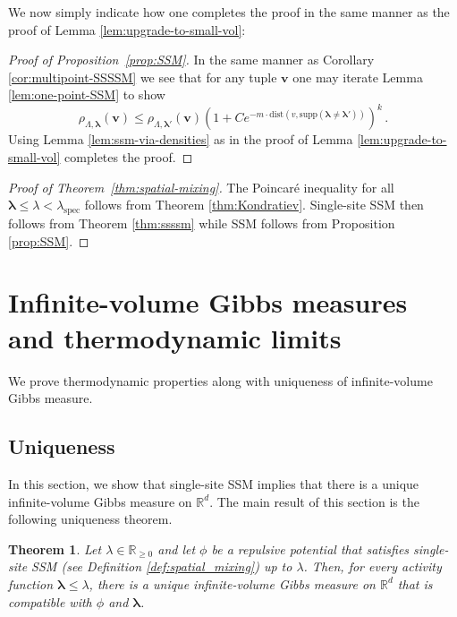 \documentclass[10pt]{amsart}
\newtheorem{theorem}{Theorem}[section]
\theoremstyle{definition}
\theoremstyle{remark}
\newcommand{\spec}{{\mathrm{spec}}}
\newcommand{\blambda}{{\boldsymbol{\lambda}}}
\newcommand{\dist}{\mathrm{dist}}
\newcommand{\R}{\mathbb{R}}
\newcommand{\potential}{\phi}
\newcommand{\activity}{\lambda}
\newcommand{\activities}{\pmb{\lambda}}
\begin{document}
	We now simply indicate how one completes the proof in the same manner as the proof of Lemma \ref{lem:upgrade-to-small-vol}:
	
	\begin{proof}[Proof of Proposition~\ref{prop:SSM}]
		In the same manner as Corollary \ref{cor:multipoint-SSSSM} we see that for any tuple $\mathbf{v}$ one may iterate Lemma \ref{lem:one-point-SSM} to show $$\rho_{\Lambda,\blambda}(\mathbf{v}) \leq \rho_{\Lambda,\blambda'}(\mathbf{v})\left( 1 + C e^{-m \cdot\dist(v,\mathrm{supp}(\blambda \neq \blambda'))}\right)^k\,.$$
		Using Lemma \ref{lem:ssm-via-densities} as in the proof of Lemma \ref{lem:upgrade-to-small-vol} completes the proof.
	\end{proof}
	
	
	\begin{proof}[Proof of Theorem~\ref{thm:spatial-mixing}]
		The Poincar\'e inequality for all $\blambda \leq \lambda < \lambda_{\spec}$ follows from Theorem \ref{thm:Kondratiev}.  Single-site SSM then follows from Theorem \ref{thm:ssssm} while SSM follows from Proposition \ref{prop:SSM}. 
	\end{proof}
	
	
	
	
	
	
	
	\section{Infinite-volume Gibbs measures and thermodynamic limits} \label{sec:uniqueness}
	
	We prove thermodynamic properties along with uniqueness of infinite-volume Gibbs measure. 
	
	\subsection{Uniqueness}
	
	In this section, we show that single-site SSM implies that there is a unique infinite-volume Gibbs measure on $\R^d$.  
	The main result of this section is the following uniqueness theorem.
	\begin{theorem} \label{thm:ssssm_uniqueness}
		Let $\activity \in \R_{\ge 0}$ and let $\potential$ be a repulsive potential that satisfies single-site SSM (see Definition \ref{def:spatial_mixing}) up to $\activity$.
		Then, for every activity function $\activities \le \activity$, there is a unique infinite-volume Gibbs measure on $\R^d$ that is compatible with $\potential$ and $\activities$.
	\end{theorem}
	
\end{document}
